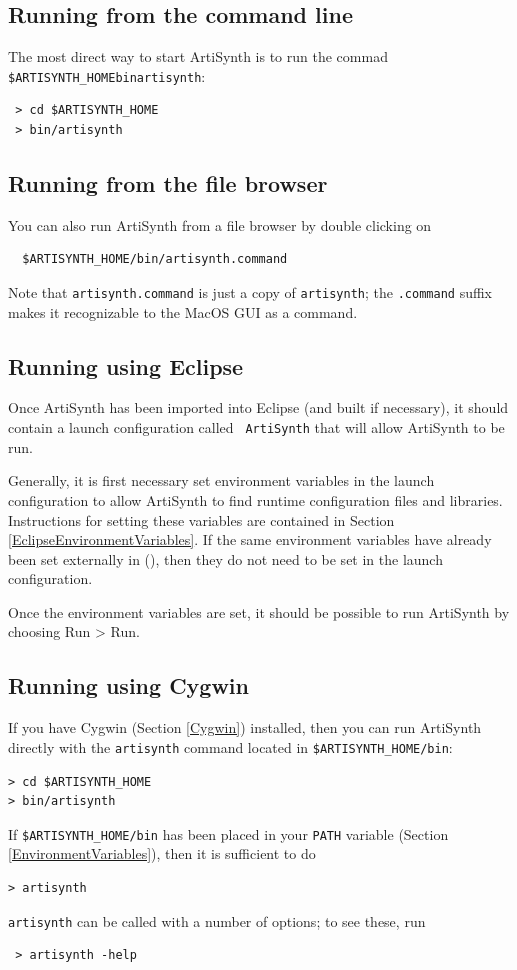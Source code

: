 \subsection{Running from the command line}
\label{artisynthCommandLine}

The most direct way to start ArtiSynth is to run the commad
{\tt \$ARTISYNTH\_HOME\SEP bin\SEP artisynth}:

\begin{verbatim}
 > cd $ARTISYNTH_HOME
 > bin/artisynth
\end{verbatim}
\ifMacOS
\subsection{Running from the file browser}

You can also run ArtiSynth from a file browser by double clicking on
\begin{verbatim}
  $ARTISYNTH_HOME/bin/artisynth.command
\end{verbatim}
Note that {\tt artisynth.command} is just a copy of {\tt artisynth};
the {\tt .command} suffix makes it recognizable to the MacOS GUI as a
command.
\fi\fi

\subsection{Running using Eclipse}

Once ArtiSynth has been imported into Eclipse (and built if
necessary), it should contain a launch configuration called {\tt
ArtiSynth} that will allow ArtiSynth to be run.

Generally, it is first necessary set environment variables in the
launch configuration to allow ArtiSynth to find runtime configuration
files and libraries. Instructions for setting these variables are
contained in Section \ref{EclipseEnvironmentVariables}.  If the same
environment variables have already been set externally in \SYSTEM
(\environmentSectionRef),
then they do not need to be set in the launch configuration.

Once the environment variables are set, it should be possible to run
ArtiSynth by choosing {\sf Run > Run}.

\ifWindows
\subsection{Running using Cygwin}

If you have Cygwin (Section \ref{Cygwin}) installed, 
then you can run ArtiSynth directly with the {\tt artisynth} command
located in {\tt \$ARTISYNTH\_HOME/bin}:
\begin{verbatim}
> cd $ARTISYNTH_HOME
> bin/artisynth
\end{verbatim}
If {\tt \$ARTISYNTH\_HOME/bin} has been placed in your {\tt PATH}
variable (Section \ref{EnvironmentVariables}), then it
is sufficient to do
\begin{verbatim}
> artisynth
\end{verbatim}
{\tt artisynth} can be called with a number of options; to see these, run
\begin{verbatim}
 > artisynth -help
\end{verbatim}
\else\fi

